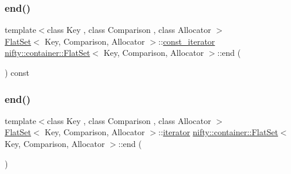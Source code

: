 \subsubsection{\texorpdfstring{end()}{end()}\hspace{0.1cm}{\footnotesize\ttfamily [1/2]}}
{\footnotesize\ttfamily template$<$class Key , class Comparison , class Allocator $>$ \\
\hyperlink{classnifty_1_1container_1_1FlatSet}{Flat\+Set}$<$ Key, Comparison, Allocator $>$\+::\hyperlink{classnifty_1_1container_1_1FlatSet_a0f4cd26da060859b18742abfd534aa24}{const\+\_\+iterator} \hyperlink{classnifty_1_1container_1_1FlatSet}{nifty\+::container\+::\+Flat\+Set}$<$ Key, Comparison, Allocator $>$\+::end (\begin{DoxyParamCaption}{ }\end{DoxyParamCaption}) const\hspace{0.3cm}{\ttfamily [inline]}}

\mbox{\label{classnifty_1_1container_1_1FlatSet_a93ce7a3126ef6e45f1d82cd71c335741}} 
\subsubsection{\texorpdfstring{end()}{end()}\hspace{0.1cm}{\footnotesize\ttfamily [2/2]}}
{\footnotesize\ttfamily template$<$class Key , class Comparison , class Allocator $>$ \\
\hyperlink{classnifty_1_1container_1_1FlatSet}{Flat\+Set}$<$ Key, Comparison, Allocator $>$\+::\hyperlink{classnifty_1_1container_1_1FlatSet_a9c7fd20cd6b1878ccb8a7e068072c795}{iterator} \hyperlink{classnifty_1_1container_1_1FlatSet}{nifty\+::container\+::\+Flat\+Set}$<$ Key, Comparison, Allocator $>$\+::end (\begin{DoxyParamCaption}{ }\end{DoxyParamCaption})\hspace{0.3cm}{\ttfamily [inline]}}

\mbox{\label{classnifty_1_1container_1_1FlatSet_a1ab96837744fc952be75365c00c815e0}} 
